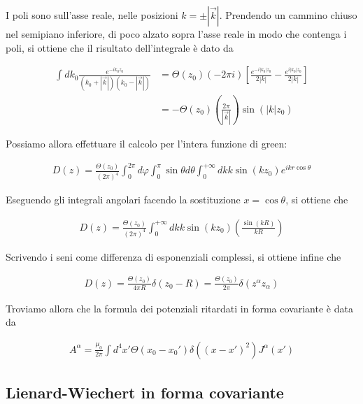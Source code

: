\documentclass{report}
\begin{document}
I poli sono sull'asse reale, nelle posizioni \(k = \pm |\vec{k}|\). Prendendo un cammino chiuso nel semipiano inferiore, di poco alzato sopra l'asse reale in modo che contenga i poli, si ottiene che il risultato dell'integrale è dato da 

\begin{align}
    \int dk_0 \frac{e^{-ik_0z_0}}{(k_0 + |\vec{k}|)(k_0 - |\vec{k}|)} &= \Theta(z_0)(-2\pi i)\left[\frac{e^{-i|k_0|z_0}}{2|k|}- \frac{e^{i|k_0|z_0}}{2|k|}\right] \\
    &= -\Theta(z_0)\left(\frac{2\pi}{|\vec{k}|}\right)\sin(|k|z_0)
\end{align}

Possiamo allora effettuare il calcolo per l'intera funzione di green: 

\begin{align}
    D(z) = \frac{\Theta(z_0)}{(2\pi)^4}\int_0^{2\pi} d\varphi\int_0^\pi \sin\theta d\theta \int_0^{+\infty} dk k \sin(kz_0)e^{ikr\cos\theta}
\end{align}

Eseguendo gli integrali angolari facendo la sostituzione \(x = \cos\theta\), si ottiene che 

\begin{align}
    D(z) = \frac{\Theta(z_0)}{(2\pi)^4}\int_0^{+\infty}dk k \sin(kz_0)\left(\frac{\sin(k R)}{kR}\right)
\end{align}

Scrivendo i seni come differenza di esponenziali complessi, si ottiene infine che 

\begin{align}
    D(z) = \frac{\Theta(z_0)}{4\pi R}\delta(z_0 - R) = \frac{\Theta(z_0)}{2\pi}\delta(z^{\alpha}z_{\alpha})
\end{align}

Troviamo allora che la formula dei potenziali ritardati in forma covariante è data da 

\begin{tcolorbox}[colback=doc!15, colframe=black, boxrule=1pt]
\begin{align}
    A^{\alpha} = \frac{\mu_0}{2\pi}\int d^4x' \Theta(x_0-x_0')\delta((x - x')^2)J^{\alpha}(x')
\end{align}
\end{tcolorbox}

\subsection{Lienard-Wiechert in forma covariante}
\end{document}
